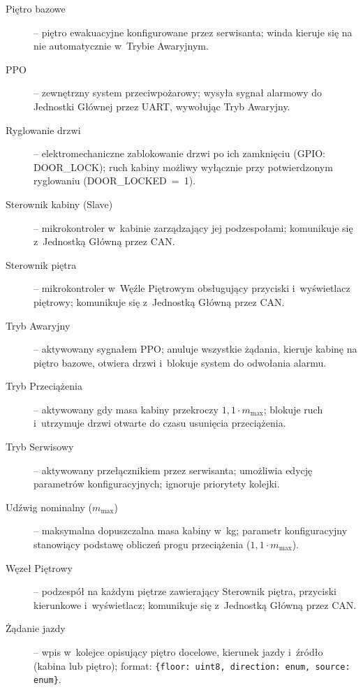 \documentclass{article}
\begin{document}
\begin{description}
  \item[Piętro bazowe] – piętro ewakuacyjne konfigurowane przez serwisanta; winda kieruje się na nie automatycznie w~Trybie Awaryjnym.
 
  \item[PPO] – zewnętrzny system przeciwpożarowy; wysyła sygnał alarmowy do Jednostki Głównej przez UART, wywołując Tryb Awaryjny.
 
  \item[Ryglowanie drzwi] – elektromechaniczne zablokowanie drzwi po ich zamknięciu (GPIO: DOOR\_LOCK); ruch kabiny możliwy wyłącznie przy potwierdzonym ryglowaniu (DOOR\_LOCKED~=~1).
 
  \item[Sterownik kabiny (Slave)] – mikrokontroler w~kabinie zarządzający jej podzespołami; komunikuje się z~Jednostką Główną przez CAN.
 
  \item[Sterownik piętra] – mikrokontroler w~Węźle Piętrowym obsługujący przyciski i~wyświetlacz piętrowy; komunikuje się z~Jednostką Główną przez CAN.
 
  \item[Tryb Awaryjny] – aktywowany sygnałem PPO; anuluje wszystkie żądania, kieruje kabinę na piętro bazowe, otwiera drzwi i~blokuje system do odwołania alarmu.
 
  \item[Tryb Przeciążenia] – aktywowany gdy masa kabiny przekroczy $1{,}1 \cdot m_\text{max}$; blokuje ruch i~utrzymuje drzwi otwarte do czasu usunięcia przeciążenia.
 
  \item[Tryb Serwisowy] – aktywowany przełącznikiem przez serwisanta; umożliwia edycję parametrów konfiguracyjnych; ignoruje priorytety kolejki.
 
  \item[Udźwig nominalny ($m_\text{max}$)] – maksymalna dopuszczalna masa kabiny w~kg; parametr konfiguracyjny stanowiący podstawę obliczeń progu przeciążenia ($1{,}1 \cdot m_\text{max}$).
 
  \item[Węzeł Piętrowy] – podzespół na każdym piętrze zawierający Sterownik piętra, przyciski kierunkowe i~wyświetlacz; komunikuje się z~Jednostką Główną przez CAN.
 
  \item[Żądanie jazdy] – wpis w~kolejce opisujący piętro docelowe, kierunek jazdy i~źródło (kabina lub piętro); format: \texttt{\{floor: uint8, direction: enum, source: enum\}}.
 
\end{description}
\end{document}
